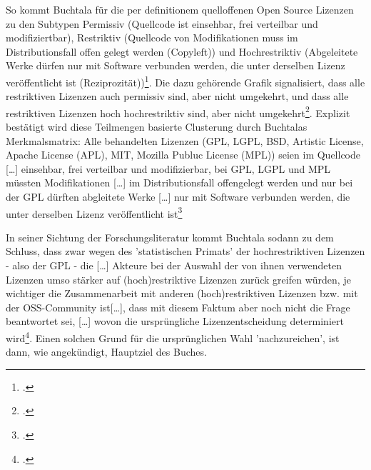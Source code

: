 \documentclass[DIV=calc,BCOR=5mm,11pt,headings=small,oneside,abstract=true, toc=bib]{scrartcl}
\begin{document}
So kommt Buchtala für die per definitionem quelloffenen Open Source Lizenzen zu
den Subtypen \glqq{}Permissiv\grqq{} (\glqq{}Quellcode ist einsehbar, frei
verteilbar und modifiziertbar\grqq{}), \glqq{}Restriktiv\grqq{}
(\glqq{}Quellcode von Modifikationen muss im Distributionsfall offen gelegt
werden (Copyleft)\grqq{}) und \glqq{}Hochrestriktiv\grqq{} (\glqq{}Abgeleitete
Werke dürfen nur mit Software verbunden werden, die unter derselben Lizenz
veröffentlicht ist (Reziprozität)\grqq{})\footcite[cf.][57 (Typo im
Original)]{Buchtala2007a}. Die dazu gehörende Grafik signalisiert, dass alle
restriktiven Lizenzen auch permissiv sind, aber nicht umgekehrt, und dass alle
restriktiven Lizenzen hoch hochrestriktiv sind, aber nicht
umgekehrt\footcite[cf.][57]{Buchtala2007a}. Explizit bestätigt wird diese
Teilmengen basierte Clusterung durch Buchtalas Merkmalsmatrix: Alle behandelten
Lizenzen (GPL, LGPL, BSD, Artistic License, Apache License (APL), MIT, Mozilla
Publuc License (MPL)) seien im \glqq{}Quellcode [\ldots] einsehbar, frei
verteilbar und modifizierbar\grqq{}, bei GPL, LGPL und MPL müssten
\glqq{}Modifikationen [\ldots] im Distributionsfall offengelegt werden\grqq{}
und nur bei der GPL dürften \glqq{}abgleitete Werke [\ldots] nur mit Software
verbunden werden, die unter derselben Lizenz veröffentlicht
ist\grqq{}\footcite[cf.][62]{Buchtala2007a}

In seiner Sichtung der Forschungsliteratur kommt Buchtala sodann zu dem Schluss,
dass zwar wegen des 'statistischen Primats' der hochrestriktiven Lizenzen - also
der GPL - die \glqq{}[\ldots] Akteure bei der Auswahl der von ihnen verwendeten
Lizenzen umso stärker auf (hoch)restriktive Lizenzen zurück greifen würden, je
wichtiger die Zusammenarbeit mit anderen (hoch)restriktiven Lizenzen bzw. mit
der OSS-Community ist[\ldots]\grqq{}, dass mit diesem Faktum aber noch nicht die
Frage beantwortet sei, \glqq{}[\ldots] wovon die ursprüngliche
Lizenzentscheidung determiniert
wird\grqq{}\footcite[cf.][156]{Buchtala2007a}. Einen solchen Grund für die
ursprünglichen Wahl 'nachzureichen', ist dann, wie angekündigt, Hauptziel des
Buches.
\end{document}
